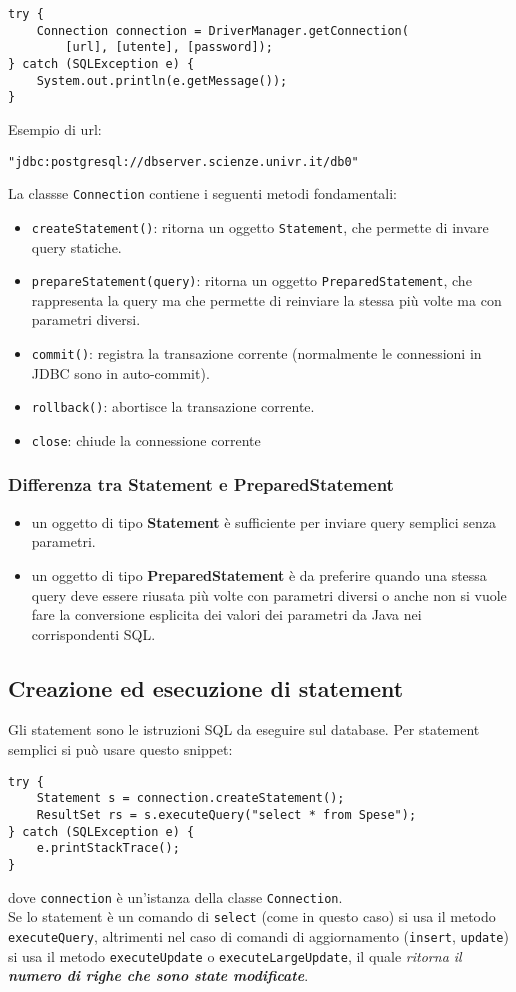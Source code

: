 \documentclass[a4paper, 10pt, titlepage]{article}
\begin{document}
\begin{lstlisting}
try {
	Connection connection = DriverManager.getConnection(
		[url], [utente], [password]);
} catch (SQLException e) {
	System.out.println(e.getMessage());
}
\end{lstlisting}
Esempio di url:
\begin{lstlisting}
"jdbc:postgresql://dbserver.scienze.univr.it/db0"
\end{lstlisting}\medskip
La classse \lstinline|Connection| contiene i seguenti metodi fondamentali:
\begin{itemize}
\item \lstinline|createStatement()|: ritorna un oggetto \lstinline|Statement|, che permette di invare query statiche.
\item \lstinline|prepareStatement(query)|: ritorna un oggetto \lstinline|PreparedStatement|, che rappresenta la query ma che permette di reinviare la stessa più volte ma con parametri diversi.
\item \lstinline|commit()|: registra la transazione corrente (normalmente le connessioni in JDBC sono in auto-commit).
\item \lstinline|rollback()|: abortisce la transazione corrente.
\item \lstinline|close|: chiude la connessione corrente
\end{itemize}

\subsubsection{Differenza tra Statement e PreparedStatement}
\begin{itemize}
\item un oggetto di tipo \textbf{Statement} è sufficiente per inviare query semplici senza parametri.
\item un oggetto di tipo \textbf{PreparedStatement} è da preferire quando una stessa query deve essere riusata più volte con parametri diversi o anche non si vuole fare la conversione esplicita dei valori dei parametri da Java nei corrispondenti SQL.
\end{itemize}

\subsection{Creazione ed esecuzione di statement}
Gli statement sono le istruzioni SQL da eseguire sul database. Per statement semplici si può usare questo snippet:
\begin{lstlisting}
try {
	Statement s = connection.createStatement();
	ResultSet rs = s.executeQuery("select * from Spese");
} catch (SQLException e) {
	e.printStackTrace();
}
\end{lstlisting}
dove \lstinline|connection| è un'istanza della classe \lstinline|Connection|. \\
Se lo statement è un comando di \lstinline|select| (come in questo caso) si usa il metodo \lstinline|executeQuery|, altrimenti nel caso di comandi di aggiornamento (\lstinline|insert|, \lstinline|update|) si usa il metodo \lstinline|executeUpdate| o \lstinline|executeLargeUpdate|, il quale \textit{ritorna il \textbf{numero di righe che sono state modificate}}.\medskip
\end{document}
